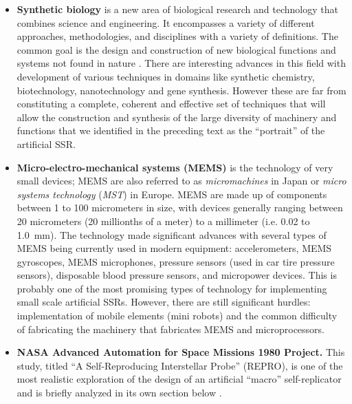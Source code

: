 \begin{itemize}
{biology}. Craig Venter and the scientists at
J. Craig Venter Institute in Rockville, MD
reported in the May 20, 2010 issue of journal
\textit{Science}
that they created a “new species---dubbed Mycoplasma mycoides
JCVI-syn1.0---that is similar to one found in nature, except that the
chromosome that controls each cell was created from scratch” \citep{smith2010, gibsonetal2010}. In the same ABC news report,
Mark Bedau, professor of Philosophy and
Humanities at Reed College in Portland, Ore., also writing in the
Nature commentary, called the new species ``a normal
bacterium with a prosthetic genome.''\citep{smith2010}
\item \textbf{Synthetic biology} is a new area of biological
research and technology that combines science and engineering. It
encompasses a variety of different approaches, methodologies, and
disciplines with a variety of definitions. The common goal is the
design and construction of new biological functions and systems not
found in nature \citep{heinemann2006}. There are interesting advances in this field with
development of various techniques in domains like synthetic chemistry,
biotechnology, nanotechnology and gene synthesis. However these are far
from constituting a complete, coherent and effective set of techniques
that will allow the construction and synthesis of the large diversity
of machinery and functions that we identified in the preceding text as
the “portrait” of the artificial SSR.
\item \textbf{Micro-electro-mechanical systems (MEMS)} is the technology
of very small devices; MEMS are also referred to as
\textit{micromachines} in Japan or \textit{micro systems technology} (\textit{MST}) in Europe. 
MEMS are made up of components between 1 to
100 micrometers in size, with devices generally ranging between 20 micrometers (20 millionths of a meter)
to a millimeter (i.e. 0.02 to 1.0~mm)\citep{lyshevski2000}. The technology made significant
advances with several types of MEMS being currently used in modern
equipment:  accelerometers, MEMS gyroscopes, MEMS microphones, pressure
sensors (used in car tire pressure sensors), disposable blood pressure
sensors, and micropower devices. This is probably one of the most
promising types of technology for implementing small scale artificial
SSRs. However, there are still significant hurdles: implementation of
mobile elements (mini robots) and the common difficulty of fabricating
the machinery that fabricates MEMS and microprocessors.
\item \textbf{NASA Advanced Automation for Space Missions 1980 Project.}
This study, titled ``A Self-Reproducing Interstellar Probe'' (REPRO), 
is one of the most realistic exploration of the design of
an artificial ``macro'' self-replicator and is briefly analyzed in its
own section below \citep{freitas1980}.
\end{itemize}


